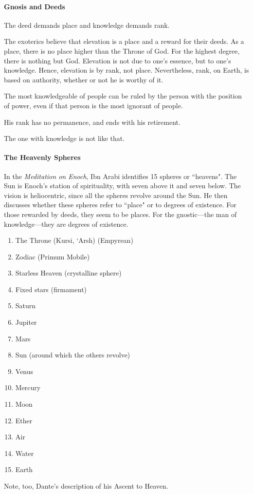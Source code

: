 \paragraph{Gnosis and Deeds}
\begin{quotex}
The deed demands place and knowledge demands rank.

\end{quotex}
The exoterics believe that elevation is a place and a reward for their deeds. As a place, there is no place higher than the Throne of God. For the highest degree, there is nothing but God. Elevation is not due to one's essence, but to one's knowledge. Hence, elevation is by rank, not place. Nevertheless, rank, on Earth, is based on authority, whether or not he is worthy of it.

\begin{quotex}
The most knowledgeable of people can be ruled by the person with the position of power, even if that person is the most ignorant of people.

\end{quotex}
His rank has no permanence, and ends with his retirement.

\begin{quotex}
The one with knowledge is not like that.

\end{quotex}
\paragraph{The Heavenly Spheres}
In the \textit{Meditation on Enoch}, Ibn Arabi identifies 15 spheres or ``heavens". The Sun is Enoch's station of spirituality, with seven above it and seven below. The vision is heliocentric, since all the spheres revolve around the Sun. He then discusses whether these spheres refer to ``place" or to degrees of existence. For those rewarded by deeds, they seem to be places. For the gnostic—the man of knowledge—they are degrees of existence.

\begin{enumerate}
\item The Throne (Kursi, `Arsh) (Empyrean) 
\item Zodiac (Primum Mobile) 
\item Starless Heaven (crystalline sphere) 
\item Fixed stars (firmament) 
\item Saturn 
\item Jupiter 
\item Mars 
\item Sun (around which the others revolve) 
\item Venus 
\item Mercury 
\item Moon 
\item Ether 
\item Air 
\item Water 
\item Earth 
\end{enumerate}
Note, too, Dante's description of his Ascent to Heaven.

